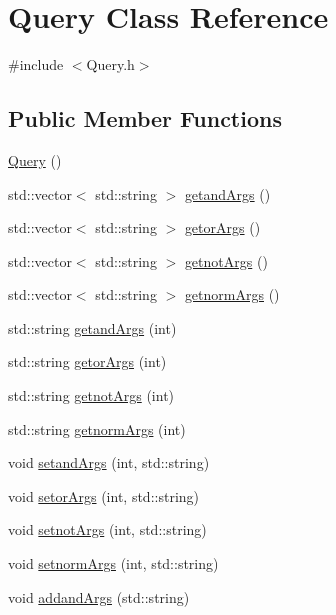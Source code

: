 \hypertarget{class_query}{}\section{Query Class Reference}
\label{class_query}


{\ttfamily \#include $<$Query.\+h$>$}

\subsection*{Public Member Functions}
\begin{DoxyCompactItemize}
\item 
\hyperlink{class_query_a4c1633236bdb9fa8d3fd3572a469889d}{Query} ()
\item 
std\+::vector$<$ std\+::string $>$ \hyperlink{class_query_a509091fc6e1bba8544991403a6d7b4b7}{getand\+Args} ()
\item 
std\+::vector$<$ std\+::string $>$ \hyperlink{class_query_ab90fc81524045a085b472dad8e6032bd}{getor\+Args} ()
\item 
std\+::vector$<$ std\+::string $>$ \hyperlink{class_query_a83014fdd314c75564ef1746fccd77407}{getnot\+Args} ()
\item 
std\+::vector$<$ std\+::string $>$ \hyperlink{class_query_afed0bd695e2b355d42ae78a79c2b2592}{getnorm\+Args} ()
\item 
std\+::string \hyperlink{class_query_aa2e86853eac7f292d4894cf8ef4260b0}{getand\+Args} (int)
\item 
std\+::string \hyperlink{class_query_ae3966de9b3bdba292a67b0e418a9d146}{getor\+Args} (int)
\item 
std\+::string \hyperlink{class_query_a7ef802901ce6e3b7b68e46b2f6659b18}{getnot\+Args} (int)
\item 
std\+::string \hyperlink{class_query_aa7d5b960f0d1cd7c83b7d191ac371d0a}{getnorm\+Args} (int)
\item 
void \hyperlink{class_query_a0497175553ef811642c5b2b3c0bd1ca2}{setand\+Args} (int, std\+::string)
\item 
void \hyperlink{class_query_afb2f5f87786fc282fefface523a81138}{setor\+Args} (int, std\+::string)
\item 
void \hyperlink{class_query_aef14c309f6f5880066f649a8f47fe3bc}{setnot\+Args} (int, std\+::string)
\item 
void \hyperlink{class_query_a24a65f32cdc1c1ee4246cbf480763557}{setnorm\+Args} (int, std\+::string)
\item 
void \hyperlink{class_query_a308104a6371bdf950435593413d527a6}{addand\+Args} (std\+::string)

\end{DoxyCompactItemize}
